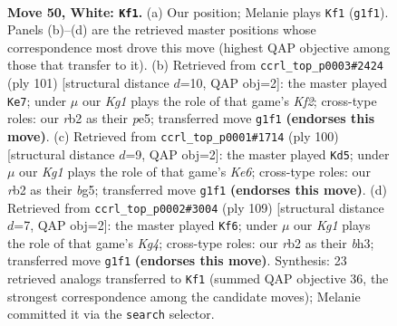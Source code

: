 \documentclass[11pt]{article}
\begin{document}
\clearpage

\begin{figure}[p]\centering
\begin{subfigure}{0.46\textwidth}\centering
\resizebox{\linewidth}{!}{%
\newchessgame
\chessboard[
  setfen={3k4/8/8/4p1p1/5p2/5B2/1r6/6K1 w - - 11 50},
  showmover=false,
  pgfstyle=straightmove, color=movearrow, markmove={g1-f1}
]}
\caption{}
\end{subfigure}\hfill
\begin{subfigure}{0.46\textwidth}\centering
\resizebox{\linewidth}{!}{%
\newchessgame
\chessboard[
  setfen={8/5k2/8/4P2P/5b2/1K3P2/6P1/8 b - - 2 51},
  showmover=false,
  pgfstyle=straightmove, color=movearrow, markmove={f7-e7}
]}
\caption{}
\end{subfigure}
\\[4pt]
\begin{subfigure}{0.46\textwidth}\centering
\resizebox{\linewidth}{!}{%
\newchessgame
\chessboard[
  setfen={8/7k/4K3/1p4b1/2pB4/8/8/8 w - - 6 51},
  showmover=false,
  pgfstyle=straightmove, color=movearrow, markmove={e6-d5}
]}
\caption{}
\end{subfigure}\hfill
\begin{subfigure}{0.46\textwidth}\centering
\resizebox{\linewidth}{!}{%
\newchessgame
\chessboard[
  setfen={8/8/1b1p4/1P1P2k1/2P5/5K1B/8/8 b - - 0 55},
  showmover=false,
  pgfstyle=straightmove, color=movearrow, markmove={g5-f6}
]}
\caption{}
\end{subfigure}
\caption{\textbf{Move 50, White: \texttt{Kf1}.} (a) Our position; Melanie plays \texttt{Kf1} (\texttt{g1f1}). Panels (b)--(d) are the retrieved master positions whose correspondence most drove this move (highest QAP objective among those that transfer to it). (b) Retrieved from \texttt{ccrl\_top\_p0003\#2424} (ply 101) [structural distance $d$=10, QAP obj=2]: the master played \texttt{Ke7}; under $\mu$ our \emph{Kg1} plays the role of that game's \emph{Kf2}; cross-type roles: our \emph{r}b2 as their \emph{p}e5; transferred move \texttt{g1f1} \textbf{(endorses this move)}. (c) Retrieved from \texttt{ccrl\_top\_p0001\#1714} (ply 100) [structural distance $d$=9, QAP obj=2]: the master played \texttt{Kd5}; under $\mu$ our \emph{Kg1} plays the role of that game's \emph{Ke6}; cross-type roles: our \emph{r}b2 as their \emph{b}g5; transferred move \texttt{g1f1} \textbf{(endorses this move)}. (d) Retrieved from \texttt{ccrl\_top\_p0002\#3004} (ply 109) [structural distance $d$=7, QAP obj=2]: the master played \texttt{Kf6}; under $\mu$ our \emph{Kg1} plays the role of that game's \emph{Kg4}; cross-type roles: our \emph{r}b2 as their \emph{b}h3; transferred move \texttt{g1f1} \textbf{(endorses this move)}. Synthesis: 23 retrieved analogs transferred to \texttt{Kf1} (summed QAP objective 36, the strongest correspondence among the candidate moves); Melanie committed it via the \texttt{search} selector.}
\label{fig:thought-m98}
\end{figure}
\end{document}
